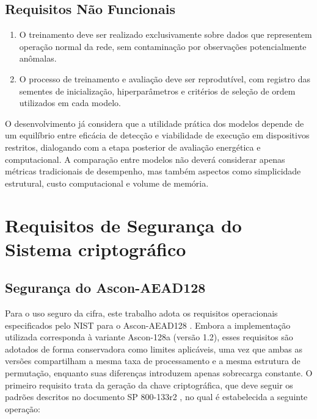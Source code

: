 \subsection{Requisitos Não Funcionais}

\begin{enumerate}

    \item[RNF1.] O treinamento deve ser realizado exclusivamente sobre dados que 
    representem operação normal da rede, sem contaminação por observações 
    potencialmente anômalas.

    \item[RNF2.] O processo de treinamento e avaliação deve ser reprodutível, com 
    registro das sementes de inicialização, hiperparâmetros e critérios de 
    seleção de ordem utilizados em cada modelo.

\end{enumerate}

O desenvolvimento já considera que a utilidade prática dos modelos depende de um equilíbrio entre eficácia de detecção e viabilidade de execução em dispositivos restritos, dialogando com a etapa posterior de avaliação energética e computacional. A comparação entre modelos não deverá considerar apenas métricas tradicionais de desempenho, mas também aspectos como simplicidade estrutural, custo computacional e volume de memória.


\section{Requisitos de Segurança do Sistema criptográfico}
\subsection{Segurança do Ascon-AEAD128}
Para o uso seguro da cifra, este trabalho adota os requisitos operacionais especificados pelo NIST para o Ascon-AEAD128 \cite{nist800232}. Embora a implementação utilizada corresponda à variante Ascon-128a (versão 1.2), esses requisitos são adotados de forma conservadora como limites aplicáveis, uma vez que ambas as versões compartilham a mesma taxa de processamento e a mesma estrutura de permutação, enquanto suas diferenças introduzem apenas sobrecarga constante. O primeiro requisito trata da geração da chave criptográfica, que deve seguir os padrões descritos no documento SP 800-133r2 , no qual é estabelecida a seguinte operação:

